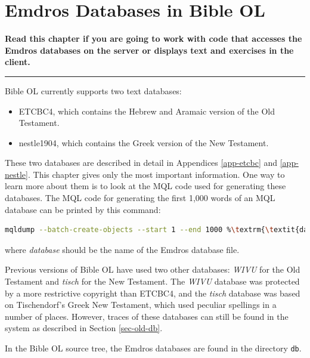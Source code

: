 \documentclass[11pt,oneside,a4paper]{memoir}
\begin{document}
\chapter{Emdros Databases in Bible OL}

\textbf{Read this chapter if you are going to work with code that accesses the Emdros databases on
  the server or displays text and exercises in the client.}
\plainbreak{3}

Bible OL currently supports two text databases:

\begin{itemize}
\item ETCBC4, which contains the Hebrew and Aramaic version of the Old
  Testament.
\item nestle1904, which contains the Greek version of the New Testament.
\end{itemize}

These two databases are described in detail in Appendices \ref{app-etcbc} and
\ref{app-nestle}. This chapter gives only the most important information.
One way to learn more about them is to look at the MQL code used for generating these databases. The
MQL code for generating the first 1,000 words of an MQL database can be printed by this command:

\begin{lstlisting}[language=bash]
mqldump --batch-create-objects --start 1 --end 1000 %\textrm{\textit{database}}\label{list-mqldump}\index{mqldump}%
\end{lstlisting}

\noindent
where \emph{database} should be the name of the Emdros database file.

Previous versions of Bible OL have used two other databases: \emph{WIVU} for the Old Testament and
\emph{tisch} for the New Testament. The \emph{WIVU} database was protected by a more restrictive
copyright than ETCBC4, and the \emph{tisch} database was based on Tischendorf's Greek New Testament,
which used peculiar spellings in a number of places. However, traces of these databases can still be
found in the system as described in Section \ref{sec-old-db}.

In the Bible OL source tree, the Emdros databases are found in the directory \texttt{db}.
\end{document}
